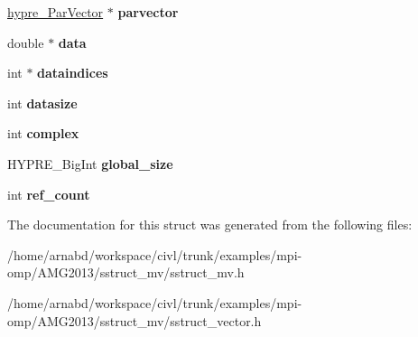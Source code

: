 \begin{DoxyCompactItemize}
\item 
\hypertarget{structhypre__SStructVector__struct_a631da84147907064ce9340f94e02d0e9}{}\hyperlink{structhypre__ParVector}{hypre\+\_\+\+Par\+Vector} $\ast$ {\bfseries parvector}\label{structhypre__SStructVector__struct_a631da84147907064ce9340f94e02d0e9}

\item 
\hypertarget{structhypre__SStructVector__struct_a389439161c4ba9e550bdb07e856904d6}{}double $\ast$ {\bfseries data}\label{structhypre__SStructVector__struct_a389439161c4ba9e550bdb07e856904d6}

\item 
\hypertarget{structhypre__SStructVector__struct_ad309cea1feb2bbb6b4cbd8a94f59242d}{}int $\ast$ {\bfseries dataindices}\label{structhypre__SStructVector__struct_ad309cea1feb2bbb6b4cbd8a94f59242d}

\item 
\hypertarget{structhypre__SStructVector__struct_a5c21cd6210e686f8cdd4b3ce3bacb3b7}{}int {\bfseries datasize}\label{structhypre__SStructVector__struct_a5c21cd6210e686f8cdd4b3ce3bacb3b7}

\item 
\hypertarget{structhypre__SStructVector__struct_a500e0f610d332d51748bd6f35928aad3}{}int {\bfseries complex}\label{structhypre__SStructVector__struct_a500e0f610d332d51748bd6f35928aad3}

\item 
\hypertarget{structhypre__SStructVector__struct_a61bef19d69ba1a7e07a87c8fde7489b0}{}H\+Y\+P\+R\+E\+\_\+\+Big\+Int {\bfseries global\+\_\+size}\label{structhypre__SStructVector__struct_a61bef19d69ba1a7e07a87c8fde7489b0}

\item 
\hypertarget{structhypre__SStructVector__struct_a031d3467e42288dec7f0f9cf9e6e94c0}{}int {\bfseries ref\+\_\+count}\label{structhypre__SStructVector__struct_a031d3467e42288dec7f0f9cf9e6e94c0}

\end{DoxyCompactItemize}


The documentation for this struct was generated from the following files\+:\begin{DoxyCompactItemize}
\item 
/home/arnabd/workspace/civl/trunk/examples/mpi-\/omp/\+A\+M\+G2013/sstruct\+\_\+mv/sstruct\+\_\+mv.\+h\item 
/home/arnabd/workspace/civl/trunk/examples/mpi-\/omp/\+A\+M\+G2013/sstruct\+\_\+mv/sstruct\+\_\+vector.\+h\end{DoxyCompactItemize}
